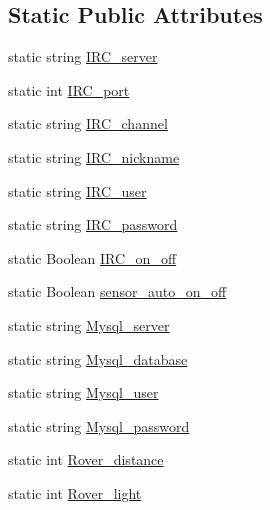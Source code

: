 \subsection*{Static Public Attributes}
\begin{CompactItemize}
\item 
static string \hyperlink{class_lego___mind_storm___control___api_1_1config_cf8a9bb7b9b80aa8223c5d6570589588}{IRC\_\-server}
\item 
static int \hyperlink{class_lego___mind_storm___control___api_1_1config_aa38b02717270aa8c27d1b13b4510b7d}{IRC\_\-port}
\item 
static string \hyperlink{class_lego___mind_storm___control___api_1_1config_e7c7ff8462db05e82ac4a83677d97b56}{IRC\_\-channel}
\item 
static string \hyperlink{class_lego___mind_storm___control___api_1_1config_29c8629a710911d92c01915fdf960603}{IRC\_\-nickname}
\item 
static string \hyperlink{class_lego___mind_storm___control___api_1_1config_a0dda338ced4f062f6b6db9826252762}{IRC\_\-user}
\item 
static string \hyperlink{class_lego___mind_storm___control___api_1_1config_f2d2481a4419823e3b90ec251a4eadee}{IRC\_\-password}
\item 
static Boolean \hyperlink{class_lego___mind_storm___control___api_1_1config_b84288d86c63a1dbdba0a561382f5251}{IRC\_\-on\_\-off}
\item 
static Boolean \hyperlink{class_lego___mind_storm___control___api_1_1config_b70d0fce3ca76b31bcbe0c253db5f0bb}{sensor\_\-auto\_\-on\_\-off}
\item 
static string \hyperlink{class_lego___mind_storm___control___api_1_1config_b26e7dc03e2dbf5f9ee3b7781643e558}{Mysql\_\-server}
\item 
static string \hyperlink{class_lego___mind_storm___control___api_1_1config_9dbe7e2486feef43dc4e778acb6a3c6c}{Mysql\_\-database}
\item 
static string \hyperlink{class_lego___mind_storm___control___api_1_1config_1b0f07bd69b6731ced664c20e9be4a76}{Mysql\_\-user}
\item 
static string \hyperlink{class_lego___mind_storm___control___api_1_1config_0c2459e37295ace37f78e6ddd641509f}{Mysql\_\-password}
\item 
static int \hyperlink{class_lego___mind_storm___control___api_1_1config_b7da66c42b401756dd63afb22c914f26}{Rover\_\-distance}
\item 
static int \hyperlink{class_lego___mind_storm___control___api_1_1config_754319f6108e0071898b720ad743a2c1}{Rover\_\-light}

\end{CompactItemize}
